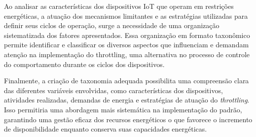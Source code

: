 Ao analisar as características dos dispositivos \acs{IoT} que operam em restrições energéticas, a atuação dos mecanismos limitantes e as estratégias utilizadas para definir seus ciclos de operação, surge a necessidade de uma organização sistematizada dos fatores apresentados. Essa organização em formato taxonômico permite identificar e classificar os diversos aspectos que influenciam e demandam atenção na implementação do throttling, uma alternativa no processo de controle do comportamento durante os ciclos dos dispositivos.


Finalmente, a criação de taxonomia adequada possibilita uma compreensão clara das diferentes variáveis envolvidas, como características dos dispositivos, atividades realizadas, demandas de energia e estratégias de atuação do \textit{throttling}. Isso permitiria uma abordagem mais sistemática na implementação do padrão, garantindo uma gestão eficaz dos recursos energéticos o que favorece o incremento de disponibilidade enquanto conserva suas capacidades energéticas.


